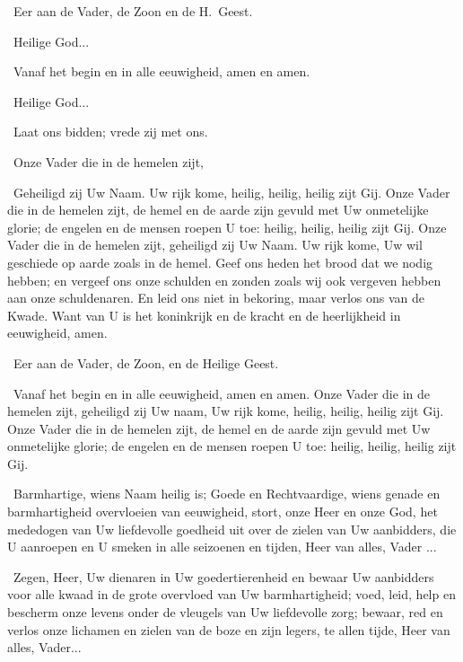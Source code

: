 \documentclass[12pt,twoside,a5paper]{article}
\begin{document}
\begin{halfparskip}
  \dd~Eer aan de Vader, de Zoon en de H.~Geest.

  \rr~Heilige God...

  \dd~Vanaf het begin en in alle eeuwigheid, amen en amen.

  \rr~Heilige God...

  \rr~Laat ons bidden; vrede zij met ons.


  \cc~Onze Vader die in de hemelen zijt,

  \rr~Geheiligd zij Uw Naam. Uw rijk kome, heilig, heilig, heilig zijt Gij. Onze Vader die in de hemelen zijt, de hemel en de aarde zijn gevuld met Uw onmetelijke glorie; de engelen en de mensen roepen U toe: heilig, heilig, heilig zijt Gij. Onze Vader die in de hemelen zijt, geheiligd zij Uw Naam. Uw rijk kome, Uw wil geschiede op aarde zoals in de hemel. Geef ons heden het brood dat we nodig hebben; en vergeef ons onze schulden en zonden zoals wij ook vergeven hebben aan onze schuldenaren. En leid ons niet in bekoring, maar verlos ons van de Kwade. Want van U is het koninkrijk en de kracht en de heerlijkheid in eeuwigheid, amen.

  \cc~Eer aan de Vader, de Zoon, en de Heilige Geest.

  \rr~Vanaf het begin en in alle eeuwigheid, amen en amen. Onze Vader die in de hemelen zijt, geheiligd zij Uw naam, Uw rijk kome, heilig, heilig, heilig zijt Gij. Onze Vader die in de hemelen zijt, de hemel en de aarde zijn gevuld met Uw onmetelijke glorie; de engelen en de mensen roepen U toe: heilig, heilig, heilig zijt Gij.

  \cc~Barmhartige, wiens Naam heilig is; Goede en Rechtvaardige, wiens genade en barmhartigheid overvloeien van eeuwigheid, stort, onze Heer en onze God, het mededogen van Uw liefdevolle goedheid uit over de zielen van Uw aanbidders, die U aanroepen en U smeken in alle seizoenen en tijden, Heer van alles, Vader ...

  \cc~Zegen, Heer, Uw dienaren in Uw goedertierenheid en bewaar Uw aanbidders voor alle kwaad in de grote overvloed van Uw barmhartigheid; voed, leid, help en bescherm onze levens onder de vleugels van Uw liefdevolle zorg; bewaar, red en verlos onze lichamen en zielen van de boze en zijn legers, te allen tijde, Heer van alles, Vader...
\end{halfparskip}
\end{document}
